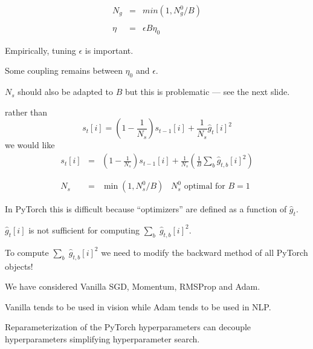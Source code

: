 {\begin{eqnarray*}
N_g & = & min(1,N^0_g/B) \\
\\
\eta & = & \epsilon B \eta_0
\end{eqnarray*}

\vfill
Empirically, tuning $\epsilon$ is important.

\vfill
Some coupling remains between $\eta_0$ and $\epsilon$.

\vfill
$N_s$ should also be adapted to $B$ but this is problematic --- see the next slide.


rather than
$$s_t[i] = \left(1-\frac{1}{N_s}\right) s_{t-1}[i] + \frac{1}{N_s} \hat{g}_t[i]^2$$
\vfill
we would like
\begin{eqnarray*}
s_t[i] & = &  \left(1-\frac{1}{N_s}\right) s_{t-1}[i] + \frac{1}{N_s} \left(\frac{1}{B} \sum_b \hat{g}_{t,b}[i]^2\right) \\
\\
\\
N_s & = & \min\left(1,N^0_s/B\right)\;\;\;\mbox{$N^0_s$ optimal for $B=1$}
\end{eqnarray*}


In PyTorch this is difficult because ``optimizers'' are defined as a function of $\hat{g}_t$.

\vfill
$\hat{g}_t[i]$ is not sufficient for computing $\sum_b \;\hat{g}_{t,b}[i]^2$.


\vfill
To compute $\sum_b \;\hat{g}_{t,b}[i]^2$ we need to modify the backward method of all PyTorch objects!


We have considered Vanilla SGD, Momentum, RMSProp and Adam.

\vfill
Vanilla tends to be used in vision while Adam tends to be used in NLP.

\vfill
Reparameterization of the PyTorch hyperparameters can decouple hyperparameters simplifying hyperparameter search.



} 


